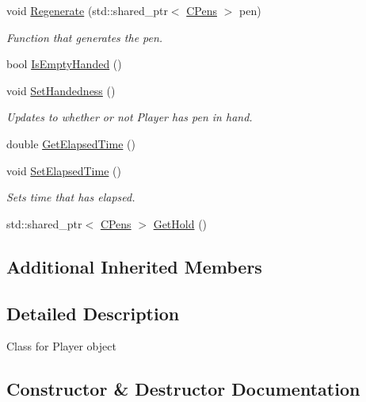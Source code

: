\begin{DoxyCompactItemize}
\item 
void \mbox{\hyperlink{class_c_player_ad2b110ed9eee0e66013110ce645b2e92}{Regenerate}} (std\+::shared\+\_\+ptr$<$ \mbox{\hyperlink{class_c_pens}{C\+Pens}} $>$ pen)
\begin{DoxyCompactList}\small\item\em Function that generates the pen. \end{DoxyCompactList}\item 
bool \mbox{\hyperlink{class_c_player_a92e3942353b9a954fa0ffdfef6de72ca}{Is\+Empty\+Handed}} ()
\item 
\mbox{\label{class_c_player_adcdf88eae2d68ebb36996e751ea62950}} 
void \mbox{\hyperlink{class_c_player_adcdf88eae2d68ebb36996e751ea62950}{Set\+Handedness}} ()
\begin{DoxyCompactList}\small\item\em Updates to whether or not Player has pen in hand. \end{DoxyCompactList}\item 
double \mbox{\hyperlink{class_c_player_aeb60d84df335907e5d0657dbfe314982}{Get\+Elapsed\+Time}} ()
\item 
\mbox{\label{class_c_player_a69eca138fffd9da731d0f5c19a5bb9cf}} 
void \mbox{\hyperlink{class_c_player_a69eca138fffd9da731d0f5c19a5bb9cf}{Set\+Elapsed\+Time}} ()
\begin{DoxyCompactList}\small\item\em Sets time that has elapsed. \end{DoxyCompactList}\item 
std\+::shared\+\_\+ptr$<$ \mbox{\hyperlink{class_c_pens}{C\+Pens}} $>$ \mbox{\hyperlink{class_c_player_afbe9687de700ec4dd9188521508bc917}{Get\+Hold}} ()
\end{DoxyCompactItemize}
\subsection*{Additional Inherited Members}


\subsection{Detailed Description}
Class for Player object 

\subsection{Constructor \& Destructor Documentation}
\mbox{\label{class_c_player_ad48a32c4432da29ef46b3ff6981c122f}} 
